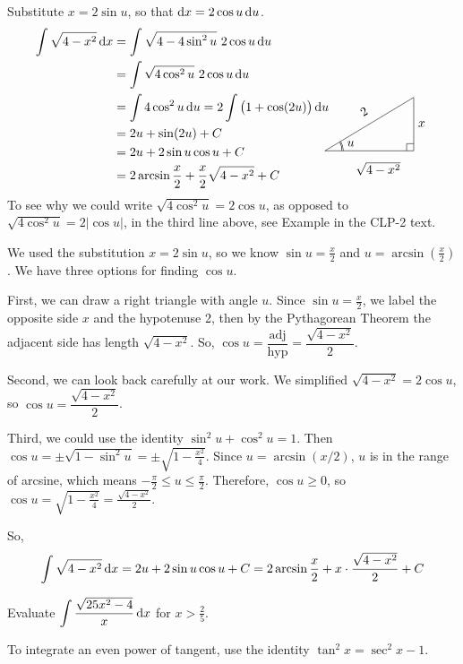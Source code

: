 \begin{solution} 
Substitute $x=2\sin u$, so that $\mathrm{d}x=2 \cos u\,\mathrm{d}u$.
\begin{align*}
\int \sqrt{4-x^2}\,\dee{x}
&=\int \sqrt{4-4\sin^2u}\ 2\cos u\,\dee{u}   \\
&=\int \sqrt{4\cos^2u}\ 2\cos u\,\dee{u}   \\
&=\int 4\cos^2 u\,\dee{u}
=2\int \big(1+\cos(2u)\big)\,\dee{u} \\
&= 2u +\sin(2u) + C \\
&=2u + 2\sin u\cos u + C \\
&=2\arcsin\frac{x}{2} + \frac{ x}{2}\sqrt{4-x^2} + C
\hskip0.5in\smash{
\trigtri{u}{\sqrt{4-x^2}}{x}{2}} 
\end{align*}
To see why we could write $\sqrt{4\cos^2 u} =2\cos u$, as opposed to 
$\sqrt{4\cos^2 u} =2|\cos u|$, in the third line above, see
Example  in the CLP-2 text.

We used the substitution $x = 2\sin u$, so we know $\sin u = \frac{x}{2}$ and $u=\arcsin(\frac{x}{2})$. We have three options for finding  $\cos u$.

First, we can draw a right triangle with angle $u$. Since $\sin u = \frac{x}{2}$, we label the opposite side $x$ and the hypotenuse 2, then by the Pythagorean Theorem the adjacent side has length $\sqrt{4-x^2}$. So, $\cos u = \dfrac{\mbox{adj}}{\mbox{hyp}} = \dfrac{\sqrt{4-x^2}}{2}$.

Second, we can look back carefully at our work. We simplified $\sqrt{4-x^2} = 2\cos u$, so $\cos u = \dfrac{\sqrt{4-x^2}}{2}$.

Third, we could use the identity $\sin^2 u + \cos^2 u =1$. Then $\cos u = \pm\sqrt{1-\sin^2 u} = \pm\sqrt{1-\frac{x^2}{4}}$. Since $u = \arcsin (x/2)$, $u$ is in the range of arcsine, which means $-\frac{\pi}{2} \leq u \leq \frac{\pi}{2}$. Therefore, $\cos u \geq 0$, so $\cos u = \sqrt{1-\frac{x^2}{4}} = \frac{\sqrt{4-x^2}}{2}$.

So, 
\[\int \sqrt{4-x^2}\,\mathrm{d}x=2u + 2\sin u\cos u + C=
2\arcsin\frac{x}{2}+x\cdot\frac{\sqrt{4-x^2}}{2}+C
\]
\end{solution}



\begin{question}[M105 2012A]
Evaluate $\displaystyle\int \frac{\sqrt{25x^2-4}}{x}\,\mathrm{d}x$ for $x>\frac{2}{5}$.
\end{question}

\begin{hint} 
To integrate an even power of tangent, use the identity $\tan^2 x = \sec^2 x - 1$.
\end{hint}

